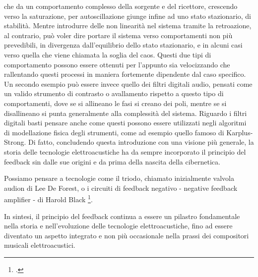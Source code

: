 che da un comportamento complesso della sorgente e del ricettore, crescendo
verso la saturazione, per autoscillazione giunge infine ad uno stato stazionario, di stabilità.
Mentre introdurre delle non linearità nel sistema tramite la retroazione,
al contrario, può voler dire portare il sistema verso comportamenti non più prevedibili,
in divergenza dall'equilibrio dello stato stazionario,
e in alcuni casi verso quella che viene chiamata la soglia del caos.
Questi due tipi di comportamento possono essere ottenuti per l'appunto
sia velocizzando che rallentando questi processi
in maniera fortemente dipendente dal caso specifico.
Un secondo esempio può essere invece quello dei filtri digitali audio,
pensati come un valido strumento
di contrasto o avallamento rispetto a questo tipo di comportamenti,
dove se si allineano le fasi si creano dei poli,
mentre se si disallineano si punta generalmente alla complessità del sistema.
Riguardo i filtri digitali basti pensare anche come questi possono essere utilizzati 
negli algoritmi di modellazione fisica
degli strumenti, come ad esempio quello famoso di Karplus-Strong.
Di fatto, concludendo questa introduzione con una visione più generale, 
la storia delle tecnologie elettroacustiche ha
da sempre incorporato il principio del feedback sin dalle sue origini e da prima della
nascita della cibernetica.


Possiamo pensare a tecnologie
come il triodo, chiamato inizialmente valvola audion di Lee De Forest,
o i circuiti di feedback negativo - negative feedback amplifier - di Harold Black
\footcite{haroldblackamplifier}.

In sintesi, il principio del feedback continua a essere un pilastro fondamentale nella storia 
e nell'evoluzione delle tecnologie elettroacustiche, 
fino ad essere diventato un aspetto integrato e non più occasionale 
nella prassi dei compositori musicali elettroacustici.

